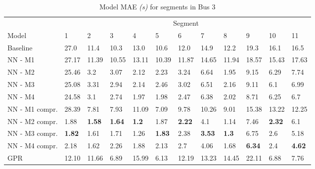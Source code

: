\begin{table}[H]
  \centering
  \caption{Model MAE \textit{(s)} for segments in Bus 3}
  \label{tbl:model-mae-of-segs-203}
  \begin{adjustbox}{center}
	\begin{tabular}{l|l|l|l|l|l|l|l|l|l|l|l}
		& \multicolumn{11}{c}{Segment}                                                                                                                                                  \\
Model          & 1             & 2             & 3             & 4            & 5             & 6             & 7             & 8            & 9             & 10            & 11              \\ 
\hline
Baseline       & 27.0          & 11.4          & 10.3          & 13.0         & 10.6          & 12.0          & 14.9          & 12.2         & 19.3          & 16.1          & 16.5            \\
NN - M1        & 27.17         & 11.39         & 10.55         & 13.11        & 10.39         & 11.87         & 14.65         & 11.94        & 18.57         & 15.43         & 17.63           \\
NN - M2        & 25.46         & 3.2           & 3.07          & 2.12         & 2.23          & 3.24          & 6.64          & 1.95         & 9.15          & 6.29          & 7.74            \\
NN - M3        & 25.08         & 3.31          & 2.94          & 2.14         & 2.46          & 3.02          & 6.51          & 2.16         & 9.11          & 6.1           & 6.99            \\
NN - M4        & 24.58         & 3.1           & 2.74          & 1.97         & 1.98          & 2.47          & 6.38          & 2.02         & 8.71          & 6.25          & 6.7             \\
NN - M1 compr. & 28.39         & 7.81          & 7.93          & 11.09        & 7.09          & 9.78          & 10.26         & 9.01         & 15.38         & 13.22         & 12.25           \\
NN - M2 compr. & 1.88          & \textbf{1.58}         & \textbf{1.64} & \textbf{1.2} & 1.87          & \textbf{2.22} & 4.1           & 1.14         & 7.46          & \textbf{2.32} & 6.1             \\
NN - M3 compr. & \textbf{1.82} & 1.61 & 1.71          & 1.26         & \textbf{1.83} & 2.38          & \textbf{3.53} & \textbf{1.3} & 6.75          & 2.6           & 5.18            \\
NN - M4 compr. & 2.18          & 1.62          & 2.26          & 1.88         & 2.13          & 2.7           & 4.06          & 1.68         & \textbf{6.34} & 2.4           & \textbf{4.62 }  \\
GPR            & 12.10         & 11.66         & 6.89          & 15.99        & 6.13          & 12.19         & 13.23         & 14.45        & 22.11         & 6.88          & 7.76           
\end{tabular}

  \end{adjustbox}
\end{table}

